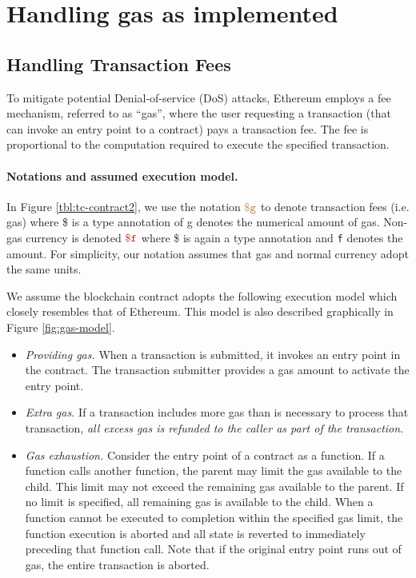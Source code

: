 
\section{Handling gas as implemented}


\subsection{Handling Transaction Fees}

To mitigate potential Denial-of-service (DoS) attacks, Ethereum employs a fee mechanism, referred to as ``gas'',
where the user requesting a transaction (that can invoke an entry point to a contract) pays a transaction fee.
The fee is proportional to the computation required to execute the specified transaction.


\paragraph{Notations and assumed execution model.}
In Figure \ref{tbl:tc-contract2}, we use the notation $\tt {\color{brown} \$g }$ to denote transaction fees (i.e. gas) where \$ is a type annotation of {\sf g} denotes the numerical amount of gas.
Non-gas currency is denoted $\fee$ where \$ is again a type annotation and {\tt f} denotes the amount.
For simplicity, our notation assumes that gas and normal currency adopt the same units.

We assume the blockchain contract adopts the following execution model which closely resembles that of Ethereum.
This model is also described graphically in Figure \ref{fig:gas-model}.

\begin{itemize}[leftmargin=1.5em]
  \item {\it Providing gas.}
    When a transaction is submitted, it invokes an entry point in the contract.
    The transaction submitter provides a gas amount to activate the entry point.

  \item {\it Extra gas.}
    If a transaction includes more gas than is necessary to process that transaction,
    \emph{all excess gas is refunded to the caller as part of the transaction}.

  \item {\it Gas exhaustion.}
    Consider the entry point of a contract as a function.
    If a function calls another function, the parent may limit the gas available to the child.
    This limit may not exceed the remaining gas available to the parent.
    If no limit is specified, all remaining gas is available to the child.
    When a function cannot be executed to completion within the specified gas limit,
    the function execution is aborted and all state is reverted to immediately preceding that function call.
    Note that if the original entry point runs out of gas, the entire transaction is aborted.

\end{itemize}


